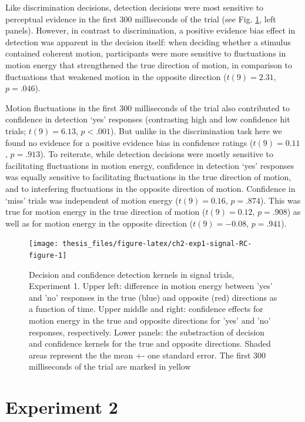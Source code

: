 \documentclass[12pt,twoside]{reedthesis}
\begin{document}
Like discrimination decisions, detection decisions were most sensitive to perceptual evidence in the first 300 milliseconds of the trial (see Fig. \ref{fig:ch2-exp1-signal-RC-figure}, left panels). However, in contrast to discrimination, a positive evidence bias effect in detection was apparent in the decision itself: when deciding whether a stimulus contained coherent motion, participants were more sensitive to fluctuations in motion energy that strengthened the true direction of motion, in comparison to fluctuations that weakened motion in the opposite direction (\(t(9) = 2.31\), \(p = .046\)).

Motion fluctuations in the first 300 milliseconds of the trial also contributed to confidence in detection `yes' responses (contrasting high and low confidence hit trials; \(t(9) = 6.13\), \(p < .001\)). But unlike in the discrimination task here we found no evidence for a positive evidence bias in confidence ratings (\(t(9) = 0.11\), \(p = .913\)). To reiterate, while detection decisions were mostly sensitive to facilitating fluctuations in motion energy, confidence in detection `yes' responses was equally sensitive to facilitating fluctuations in the true direction of motion, and to interfering fluctuations in the opposite direction of motion.
Confidence in `miss' trials was independent of motion energy (\(t(9) = 0.16\), \(p = .874\)). This was true for motion energy in the true direction of motion (\(t(9) = 0.12\), \(p = .908\)) as well as for motion energy in the opposite direction (\(t(9) = -0.08\), \(p = .941\)).
\begin{figure}
\texttt{[image: thesis\_files/figure-latex/ch2-exp1-signal-RC-figure-1]} \caption[Reverse correlation of detection signal trials, Exp. 1]{Decision and confidence detection kernels in signal trials, Experiment 1. Upper left: difference in motion energy between 'yes' and 'no' responses in the true (blue) and opposite (red) directions as a function of time. Upper middle and right: confidence effects for motion energy in the true and opposite directions for 'yes' and 'no' responses, respectively. Lower panels: the substraction of decision and confidence kernels for the true and opposite directions. Shaded areas represent the the mean +- one standard error. The first 300 milliseconds of the trial are marked in yellow}\label{fig:ch2-exp1-signal-RC-figure}
\end{figure}
\hypertarget{experiment-2-1}{%
\section{Experiment 2}\label{experiment-2-1}}
\end{document}
